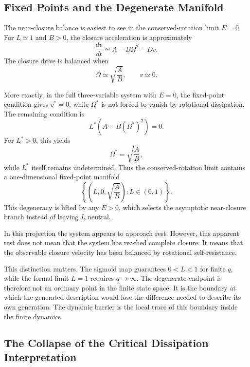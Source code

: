 \subsection{Fixed Points and the Degenerate Manifold}

The near-closure balance is easiest to see in the conserved-rotation
limit $E=0$.
For $L\simeq1$ and $B>0$, the closure acceleration is approximately
\begin{equation}
  \frac{dv}{dt}
  \simeq
  A
  -
  B\Omega^2
  -
  Dv .
\end{equation}
The closure drive is balanced when
\begin{equation}
  \Omega\simeq\sqrt{\frac{A}{B}},
  \qquad
  v\simeq0 .
\end{equation}

More exactly, in the full three-variable system with $E=0$,
the fixed-point condition gives $v^*=0$,
while $\Omega^*$ is not forced to vanish by rotational dissipation.
The remaining condition is
\begin{equation}
  L^*\left(A-B(\Omega^*)^2\right)=0 .
\end{equation}
For $L^*>0$, this yields
\begin{equation}
  \Omega^*=\sqrt{\frac{A}{B}},
\end{equation}
while $L^*$ itself remains undetermined.
Thus the conserved-rotation limit contains a one-dimensional
fixed-point manifold
\begin{equation}
  \left\{ \left(L,0,\sqrt{\frac{A}{B}}\right) : L\in(0,1) \right\}.
\end{equation}
This degeneracy is lifted by any $E>0$,
which selects the asymptotic near-closure branch instead of leaving
$L$ neutral.

In this projection the system appears to approach rest.
However, this apparent rest does not mean that the system has reached
complete closure.
It means that the observable closure velocity has been balanced by
rotational self-resistance.

This distinction matters.
The sigmoid map guarantees $0<L<1$ for finite $q$,
while the formal limit $L=1$ requires $q\to\infty$.
The degenerate endpoint is therefore not an ordinary point in the
finite state space.
It is the boundary at which the generated description would lose the
difference needed to describe its own generation.
The dynamic barrier is the local trace of this boundary inside the
finite dynamics.

\subsection{The Collapse of the Critical Dissipation Interpretation}

